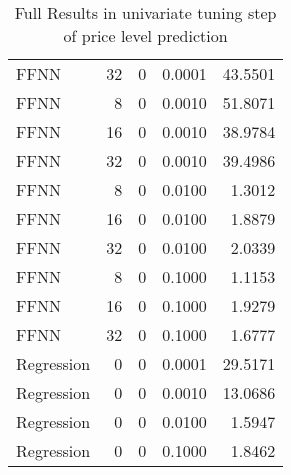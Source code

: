 \begin{table}[h!]
\begin{adjustbox}{max width=\textwidth}
\begin{tabular}{lrrrr}
  FFNN &    32 &     0 & 0.0001 & 43.5501 \\ 
  FFNN &     8 &     0 & 0.0010 & 51.8071 \\ 
  FFNN &    16 &     0 & 0.0010 & 38.9784 \\ 
  FFNN &    32 &     0 & 0.0010 & 39.4986 \\ 
  FFNN &     8 &     0 & 0.0100 & 1.3012 \\ 
  FFNN &    16 &     0 & 0.0100 & 1.8879 \\ 
  FFNN &    32 &     0 & 0.0100 & 2.0339 \\ 
  FFNN &     8 &     0 & 0.1000 & 1.1153 \\ 
  FFNN &    16 &     0 & 0.1000 & 1.9279 \\ 
  FFNN &    32 &     0 & 0.1000 & 1.6777 \\ 
  Regression &     0 &     0 & 0.0001 & 29.5171 \\ 
  Regression &     0 &     0 & 0.0010 & 13.0686 \\ 
  Regression &     0 &     0 & 0.0100 & 1.5947 \\ 
  Regression &     0 &     0 & 0.1000 & 1.8462 \\ 
   \hline
 \end{tabular}
\end{adjustbox}
\caption{Full Results in univariate tuning step of price level prediction} 
\label{tab:level.par.tuning.full}
\end{table}

